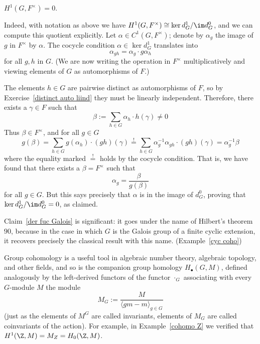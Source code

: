 \begin{claim}\label{der fuc Galois}
$H^1(G,F^{\times})=0$.
\end{claim}
Indeed, with notation as above we have $H^1(G,F^\times)\cong\ker d^1_G/\im d^0_G$, and we can compute this quotient explicitly. Let $\alpha\in C^1(G,F^\times)$; denote by $\alpha_g$ the image
of $g$ in $F^\times$ by $\alpha$. The cocycle condition $\alpha\in\ker d^1_G$ translates into
\[\alpha_{gh}=\alpha_{g}\cdot g\alpha_{h}\]
for all $g, h$ in $G$. (We are now writing the operation in $F^\times$ multiplicatively and
viewing elements of $G$ as automorphisms of $F$.)\par
The elements $h\in G$ are pairwise distinct as automorphisms of $F$, so by Exercise~\ref{distinct auto liind} they must be linearly independent. Therefore, there exists a $\gamma\in F$ such that
\[\beta:=\sum_{h\in G}\alpha_h\cdot h(\gamma)\neq 0\]
Thus $\beta\in F^\times$, and for all $g\in G$
\[g(\beta)=\sum_{h\in G}g(\alpha_h)\cdot(gh)(\gamma)\stackrel{!}{=}\sum_{h\in G}\alpha^{-1}_g\alpha_{gh}\cdot(gh)(\gamma)=\alpha_g^{-1}\beta\]
where the equality marked $\stackrel{!}{=}$ holds by the cocycle condition. That is, we have
found that there exists a $\beta=F^{\times}$ such that
\[\alpha_g=\dfrac{\beta}{g(\beta)}\]
for all $g\in G$. But this says precisely that $\alpha$ is in the image of $d^0_G$, proving that
$\ker d^1_G/\im d^0_G=0$, as claimed.\par
Claim~\ref{der fuc Galois} is significant: it goes under the name of Hilbert's theorem $90$, because
in the case in which $G$ is the Galois group of a finite cyclic extension, it recovers precisely the classical result with this name. (Example~\ref{cyc coho})\par
Group cohomology is a useful tool in algebraic number theory, algebraic topology, and other fields, and so is the companion group homology $H_{\bullet}(G,M)$, defined analogously by the left-derived functors of the functor $\cdot_{G}$ associating with every $G$-module $M$ the module
\[M_G:=\dfrac{M}{\langle gm-m\rangle_{g\in G}}\]
(just as the elements of $M^G$ are called invariants, elements of $M_G$ are called coinvariants of the action). For example, in Example~\ref{cohomo Z} we verified that $H^1(\Z,M)=M_Z=H_0(\Z,M)$.

